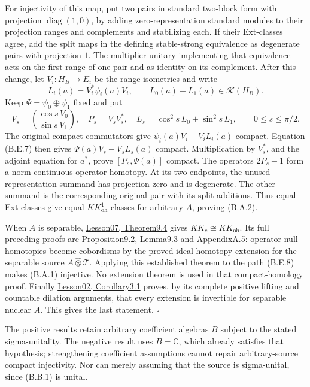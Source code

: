 \documentclass[
  11pt,
]{article}
\begin{document}
For injectivity of this map, put two pairs in standard two-block form
with projection \(\operatorname{diag}(1,0)\), by adding
zero-representation standard modules to their projection ranges and
complements and stabilizing each. If their Ext-classes agree, add the
split maps in the defining stable-strong equivalence as degenerate pairs
with projection \(1\). The multiplier unitary implementing that
equivalence acts on the first range of one pair and as identity on its
complement. After this change, let \(V_i:H_B\to E_i\) be the range
isometries and write \[
L_i(a)=V_i^*\psi_i(a)V_i,\qquad
L_0(a)-L_1(a)\in\mathcal K(H_B).
\tag{B.E.7}
\] Keep \(\Psi=\psi_0\oplus\psi_1\) fixed and put \[
V_s=\binom{\cos s\,V_0}{\sin s\,V_1},\quad
P_s=V_sV_s^*,\quad
L_s=\cos^2s\,L_0+\sin^2s\,L_1,
\qquad0\le s\le\pi/2.
\tag{B.E.8}
\] The original compact commutators give \(\psi_i(a)V_i-V_iL_i(a)\)
compact. Equation (B.E.7) then gives \(\Psi(a)V_s-V_sL_s(a)\) compact.
Multiplication by \(V_s^*\), and the adjoint equation for \(a^*\), prove
\([P_s,\Psi(a)]\) compact. The operators \(2P_s-1\) form a
norm-continuous operator homotopy. At its two endpoints, the unused
representation summand has projection zero and is degenerate. The other
summand is the corresponding original pair with its split additions.
Thus equal Ext-classes give equal \(KK_{\mathrm{oh}}^1\)-classes for
arbitrary \(A\), proving (B.A.2).

When \(A\) is separable,
\href{KT-KK-07.html\#9-cobordism-and-compact-homology}{Lesson07,
Theorem9.4} gives \(KK_c\cong KK_{\mathrm{oh}}\). Its full preceding
proofs are Proposition9.2, Lemma9.3 and
\href{KT-KK-07.html\#a-5-extending-an-operator-homotopy-from-an-ideal}{AppendixA.5}:
operator null-homotopies become cobordisms by the proved ideal homotopy
extension for the separable source \(A\widehat\otimes\mathcal T\).
Applying this established theorem to the path (B.E.8) makes (B.A.1)
injective. No extension theorem is used in that compact-homology proof.
Finally
\href{KT-KK-02.html\#corollary-3-1-the-extension-group-of-a-nuclear-algebra}{Lesson02,
Corollary3.1} proves, by its complete positive lifting and countable
dilation arguments, that every extension is invertible for separable
nuclear \(A\). This gives the last statement. \(\square\)

The positive results retain arbitrary coefficient algebras \(B\) subject
to the stated sigma-unitality. The negative result uses \(B=\mathbb C\),
which already satisfies that hypothesis; strengthening coefficient
assumptions cannot repair arbitrary-source compact injectivity. Nor can
merely assuming that the source is sigma-unital, since (B.B.1) is
unital.
\end{document}
